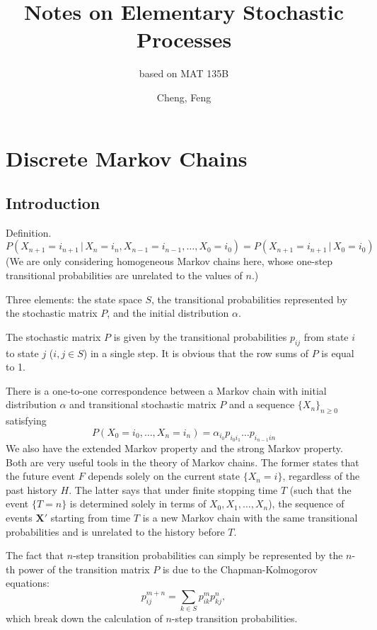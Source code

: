\documentclass[11pt]{article}
\title{Notes on Elementary Stochastic Processes}
\author{Cheng, Feng}
\subtitle{based on MAT 135B}
\date{}
\newcommand{\where}{\,|\,}
\begin{document}
\maketitle


\setcounter{secnumdepth}{0}

\section{Discrete Markov Chains}

\subsection{Introduction}
Definition.
\[
P(X_{n+1}=i_{n+1} \where X_{n}=i_{n},X_{n- 1}=i_{n- 1},\dots ,X_{0}=i_{0})=P(X_{n+1}=i_{n+1} \where X_{0}=i_{0})
\]
(We are only considering homogeneous Markov chains here, whose one-step transitional probabilities are unrelated to the values of $n$.)

Three elements: the state space $S$, the transitional probabilities represented by the stochastic matrix $P$, and the initial distribution $\alpha $.

The stochastic matrix $P$ is given by the transitional probabilities $p_{ij}$ from state $i$ to state $j$ ($i,j\in S$) in a single step. It is obvious that the row sums of $P$ is equal to 1.

There is a one-to-one correspondence between a Markov chain with initial distribution $\alpha $ and transitional stochastic matrix $P$ and a sequence $\{X_{n}\}_{n\geq 0}$ satisfying
\[
P(X_{0}=i_{0},\dots ,X_{n}=i_{n})=\alpha _{i_{0}}p_{i_{0}i_{1}}\dots p_{i_{n- 1}in}
\]
We also have the extended Markov property and the strong Markov property. Both are very useful tools in the theory of Markov chains.
The former states that the future event $F$ depends solely on the current state $\{X_{n}=i\}$, regardless of the past history $H$.
The latter says that under finite stopping time $T$ (such that the event $\{T=n\}$ is determined solely in terms of $X_{0},X_{1},\dots ,X_{n}$), the sequence of events $\mathbf{X' }$ starting from time $T$ is a new Markov chain with the same transitional probabilities and is unrelated to the history before $T$.

The fact that $n$-step transition probabilities can simply be represented by the $n$-th power of the transition matrix $P$ is due to the Chapman-Kolmogorov equations:
\[
p_{ij}^{m+n}=\sum_{k\in S}p_{ik}^{m}p_{kj}^{n},
\]
which break down the calculation of $n$-step transition probabilities.
\end{document}
